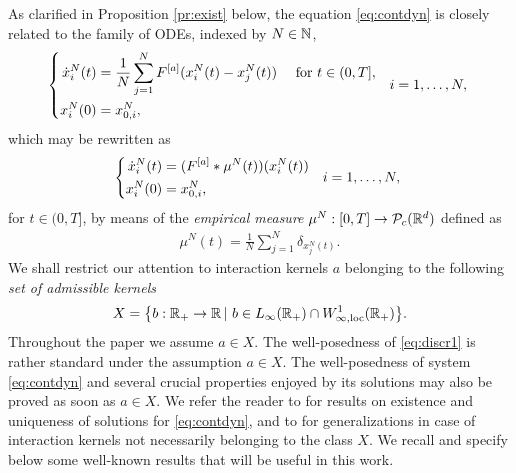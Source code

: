 {As clarified in Proposition \ref{pr:exist} below,} the equation \eqref{eq:contdyn} is closely related to the family of ODEs, indexed by $N \in \mathbb{N}$,
\begin{align}\label{eq:discrdyn}
\left\{\begin{aligned}
\dot{x}^N_i(t) &= \frac{1}{N}\sum^N_{j = 1}F^{[a]}(x^N_i(t) - x^N_j(t)) \quad \text{ for } t \in (0,T],\\
x_i^N(0) &= x^N_{0,i},
\end{aligned} \quad i = 1, \ldots, N, \right.
\end{align}
which may be rewritten as 
\begin{align}\label{eq:discr1}
\left\{\begin{aligned}
\dot{x}^N_i(t) &= (F^{[a]}*\mu^N(t))(x^N_i(t)) \\
x^N_i(0) &= x^N_{0,i},
\end{aligned} \quad i = 1, \ldots, N, \right.
\end{align}
for $t\in(0,T]$, by means of the \textit{empirical measure} $\mu^N:[0,T]\rightarrow\mathcal{P}_c(\mathbb{R}^d)$ defined as
\begin{align}\label{eq:empmeas}
\mu^N(t) = \frac{1}{N}\sum^N_{j = 1} \delta_ {x^N_j(t)}.
\end{align}
{We shall restrict our attention to interaction kernels $a$ belonging to the following \textit{set of admissible kernels}
\begin{align*}
	X=\bigl\{b:\mathbb{R}_+\rightarrow\mathbb{R}\,|\ b \in L_{\infty}(\mathbb{R}_+) \cap W^{1}_{\infty,\textup{loc}}(\mathbb{R}_+) \bigr \}.
\end{align*}
Throughout the paper we assume $a \in X$.}
The well-posedness of \eqref{eq:discr1} is rather standard under the assumption $a \in X$. The well-posedness of system \eqref{eq:contdyn} and several crucial properties enjoyed by its solutions may also be proved as soon as $a \in X$.
We refer the reader to \cite{AGS} for results on existence and uniqueness of solutions for \eqref{eq:contdyn}, and to  \cite{13-Carrillo-Choi-Hauray-MFL} for generalizations in case of interaction kernels not necessarily belonging to the class $X$. We recall and {specify} below some {well-known} results that will be useful in this work.


